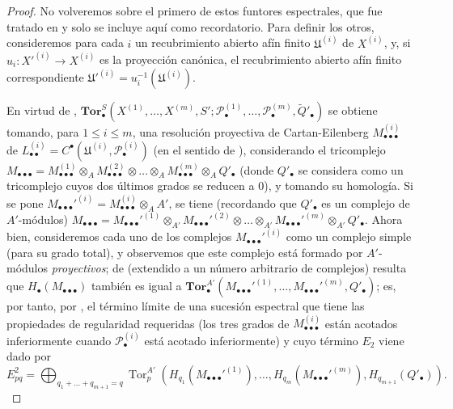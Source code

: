 \begin{proof}
No volveremos sobre el primero de estos funtores espectrales, que fue tratado
en  y solo se incluye aquí como recordatorio. Para definir
los otros, consideremos para cada $i$ un recubrimiento abierto afín finito
$\mathfrak U^{(i)}$ de $X^{(i)}$, y, si
$u_i:X'^{(i)}\to X^{(i)}$ es la proyección canónica, el recubrimiento abierto
afín finito correspondiente
$\mathfrak U'^{(i)}=u_i^{-1}(\mathfrak U^{(i)})$.

En virtud de ,
$\mathbf{Tor}_\bullet^S(X^{(1)},\ldots,X^{(m)},S';
\mathscr P_\bullet^{(1)},\ldots,\mathscr P_\bullet^{(m)},
\widetilde{Q}'_\bullet)$ se obtiene tomando, para $1\leq i\leq m$, una
resolución proyectiva de Cartan-Eilenberg
$M_{\bullet\bullet\bullet}^{(i)}$ de
$L_{\bullet\bullet}^{(i)}=C^\bullet(\mathfrak U^{(i)},
\mathscr P_\bullet^{(i)})$ (en el sentido de ),
considerando el tricomplejo
$M_{\bullet\bullet\bullet}
=M_{\bullet\bullet\bullet}^{(1)}\otimes_A
M_{\bullet\bullet\bullet}^{(2)}\otimes\ldots\otimes_A
M_{\bullet\bullet\bullet}^{(m)}\otimes_A Q'_\bullet$
(donde $Q'_\bullet$ se considera como un tricomplejo cuyos dos últimos
grados se reducen a $0$), y tomando su homología. Si se pone
$M_{\bullet\bullet\bullet}'^{(i)}=
M_{\bullet\bullet\bullet}^{(i)}\otimes_A A'$, se tiene (recordando que
$Q'_\bullet$ es un complejo de $A'$-módulos)
$M_{\bullet\bullet\bullet}
=M_{\bullet\bullet\bullet}'^{(1)}\otimes_{A'}
M_{\bullet\bullet\bullet}'^{(2)}\otimes\ldots\otimes_{A'}
M_{\bullet\bullet\bullet}'^{(m)}\otimes_{A'} Q'_\bullet$.
Ahora bien, consideremos cada uno de los complejos
$M_{\bullet\bullet\bullet}'^{(i)}$ como un complejo simple (para su grado
total), y observemos que este complejo está formado por $A'$-módulos
\emph{proyectivos}; de  (extendido a un número arbitrario de
complejos) resulta que $H_\bullet(M_{\bullet\bullet\bullet})$ también es
igual a
$\mathbf{Tor}_\bullet^{A'}
(M_{\bullet\bullet\bullet}'^{(1)},\ldots,
M_{\bullet\bullet\bullet}'^{(m)},Q'_\bullet)$;
es, por tanto, por , el término límite de una sucesión
espectral que tiene las propiedades de regularidad requeridas (los tres
grados de $M_{\bullet\bullet\bullet}^{(i)}$ están acotados inferiormente
cuando $\mathscr P_\bullet^{(i)}$ está acotado inferiormente) y cuyo término
$E_2$ viene dado por
\[
  E_{pq}^2
  =\bigoplus_{q_1+\ldots+q_{m+1}=q}
  \operatorname{Tor}_p^{A'}
  (H_{q_1}(M_{\bullet\bullet\bullet}'^{(1)}),\ldots,
   H_{q_m}(M_{\bullet\bullet\bullet}'^{(m)}),H_{q_{m+1}}(Q'_\bullet)).
\]


\end{proof}
